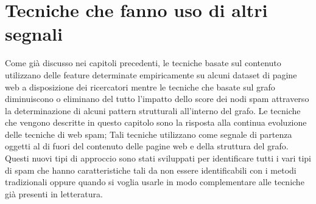 \chapter{Tecniche che fanno uso di altri segnali}
 Come già discusso nei capitoli precedenti, le tecniche basate sul contenuto utilizzano delle feature determinate empiricamente su alcuni dataset di pagine web a disposizione dei ricercatori mentre le tecniche che basate sul grafo diminuiscono o eliminano del tutto l'impatto dello score dei nodi spam attraverso la determinazione di alcuni pattern strutturali all'interno del grafo.  Le tecniche che vengono descritte in questo capitolo sono la risposta alla continua evoluzione delle tecniche di web spam; Tali tecniche utilizzano come segnale di partenza oggetti al di fuori del contenuto delle pagine web e della struttura del grafo. Questi nuovi tipi di approccio sono stati sviluppati per identificare tutti i vari tipi di spam che hanno caratteristiche tali da non essere identificabili con i metodi tradizionali oppure quando si voglia usarle in modo complementare alle tecniche già presenti in letteratura. 


